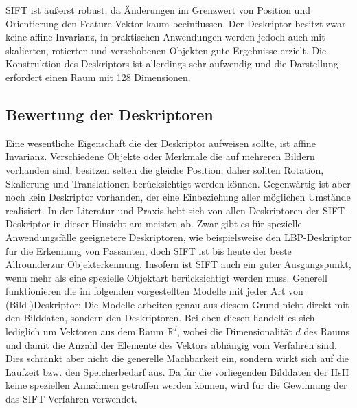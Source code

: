 SIFT ist äußerst robust, da Änderungen im Grenzwert von Position und Orientierung den Feature-Vektor kaum beeinflussen. Der Deskriptor besitzt zwar keine affine Invarianz, in praktischen Anwendungen werden jedoch auch mit skalierten, rotierten und verschobenen Objekten gute Ergebnisse erzielt. Die Konstruktion des Deskriptors ist allerdings sehr aufwendig und die Darstellung erfordert einen Raum mit 128 Dimensionen.  \cite{idp2005}

\subsection{Bewertung der Deskriptoren}

Eine wesentliche Eigenschaft die der Deskriptor aufweisen sollte, ist affine Invarianz. Verschiedene Objekte oder Merkmale die auf mehreren Bildern vorhanden sind, besitzen selten die gleiche Position, daher sollten Rotation, Skalierung und Translationen berücksichtigt werden können. Gegenwärtig ist aber noch kein Deskriptor vorhanden, der eine Einbeziehung aller möglichen Umstände realisiert. In der Literatur und Praxis hebt sich von allen Deskriptoren der SIFT-Deskriptor in dieser Hinsicht am meisten ab. Zwar gibt es für spezielle Anwendungsfälle geeignetere Deskriptoren, wie beispielsweise den LBP-Deskriptor für die Erkennung von Passanten, doch SIFT ist bis heute der beste \glqq Allrounder\grqq zur Objekterkennung. Insofern ist SIFT auch ein guter Ausgangspunkt, wenn mehr als eine spezielle Objektart berücksichtigt werden muss. Generell funktionieren die im folgenden vorgestellten Modelle mit jeder Art von (Bild-)Deskriptor: Die Modelle arbeiten genau aus diesem Grund nicht direkt mit den Bilddaten, sondern den Deskriptoren. Bei eben diesen handelt es sich lediglich um Vektoren aus dem Raum $\mathbb{R}^d$, wobei die Dimensionalität $d$ des Raums und damit die Anzahl der Elemente des Vektors abhängig vom Verfahren sind. Dies schränkt aber nicht die generelle Machbarkeit ein, sondern wirkt sich auf die Laufzeit bzw. den Speicherbedarf aus. Da für die vorliegenden Bilddaten der HsH keine speziellen Annahmen getroffen werden können, wird für die Gewinnung der  das SIFT-Verfahren verwendet. 


